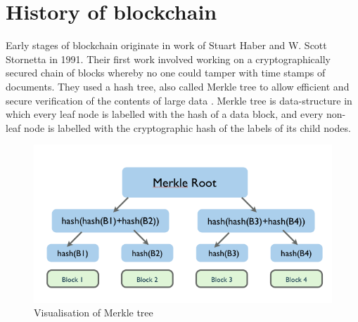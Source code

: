 \section{History of blockchain}
Early stages of blockchain originate in work of  Stuart Haber and W. Scott Stornetta  in 1991. Their first work involved working on a cryptographically secured chain of blocks whereby no one could tamper with time stamps of documents. They used a hash tree, also called Merkle tree to allow efficient and secure verification of the contents of large data \cite{blockchain_history}. Merkle tree is data-structure in which every leaf node is labelled with the hash of a data block, and every non-leaf node is labelled with the cryptographic hash of the labels of its child nodes. \cite{merkle_tree}

\begin{figure}[H]
    \begin{left}
        \begin{minipage}{\linewidth}
            \begin{left}
                \includegraphics[width=\textwidth,keepaspectratio]{img/blockchain-hash-tree.jpg}
                \caption{Visualisation of Merkle tree}
                \label{obr 1.1.1}
            \end{left}
        \end{minipage}
    \end{left}
\end{figure}


